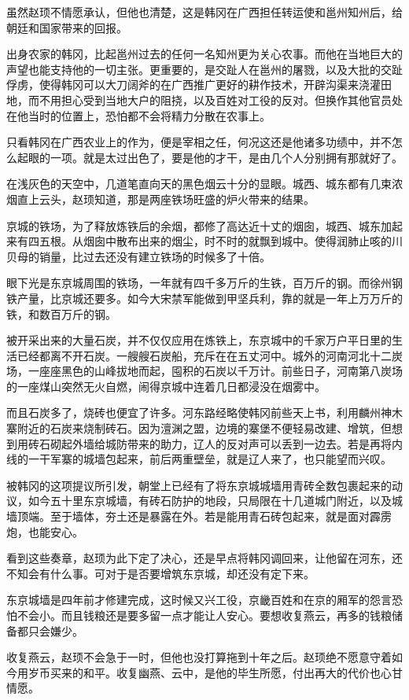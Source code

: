 虽然赵顼不情愿承认，但他也清楚，这是韩冈在广西担任转运使和邕州知州后，给朝廷和国家带来的回报。

出身农家的韩冈，比起邕州过去的任何一名知州更为关心农事。而他在当地巨大的声望也能支持他的一切主张。更重要的，是交趾人在邕州的屠戮，以及大批的交趾俘虏，使得韩冈可以大刀阔斧的在广西推广更好的耕作技术，开辟沟渠来浇灌田地，而不用担心受到当地大户的阻挠，以及百姓对工役的反对。但换作其他官员处在他当时的位置上，恐怕都不会将精力分散在农事上。

只看韩冈在广西农业上的作为，便是宰相之任，何况这还是他诸多功绩中，并不怎么起眼的一项。就是太过出色了，要是他的才干，是由几个人分别拥有那就好了。

在浅灰色的天空中，几道笔直向天的黑色烟云十分的显眼。城西、城东都有几束浓烟直上云头，赵顼知道，那是两座铁场旺盛的炉火带来的结果。

京城的铁场，为了释放炼铁后的余烟，都修了高达近十丈的烟囱，城西、城东加起来有四五根。从烟囱中散布出来的烟尘，时不时的就飘到城中。使得润肺止咳的川贝母的销量，比过去还没有建立铁场的时候多了十倍。

眼下光是东京城周围的铁场，一年就有四千多万斤的生铁，百万斤的钢。而徐州钢铁产量，比京城还要多。如今大宋禁军能做到甲坚兵利，靠的就是一年上万万斤的铁，和数百万斤的钢。

被开采出来的大量石炭，并不仅仅应用在炼铁上，东京城中的千家万户平日里的生活已经都离不开石炭。一艘艘石炭船，充斥在在五丈河中。城外的河南河北十二炭场，一座座黑色的山峰拔地而起，囤积的石炭以千万计。前些日子，河南第八炭场的一座煤山突然无火自燃，闹得京城中连着几日都浸没在烟雾中。

而且石炭多了，烧砖也便宜了许多。河东路经略使韩冈前些天上书，利用麟州神木寨附近的石炭来烧制砖石。因为澶渊之盟，边境的寨堡不便轻易改建、增筑，但想到用砖石砌起外墙给城防带来的助力，辽人的反对声可以丢到一边去。若是再将内线的一干军寨的城墙包起来，前后两重壁垒，就是辽人来了，也只能望而兴叹。

被韩冈的这项提议所引发，朝堂上已经有了将东京城城墙用青砖全数包裹起来的动议，如今五十里东京城墙，有砖石防护的地段，只局限在十几道城门附近，以及城墙顶端。至于墙体，夯土还是暴露在外。若是能用青石砖包起来，就是面对霹雳炮，也能安心。

看到这些奏章，赵顼为此下定了决心，还是早点将韩冈调回来，让他留在河东，还不知会有什么事。可对于是否要增筑东京城，却还没有定下来。

东京城墙是四年前才修建完成，这时候又兴工役，京畿百姓和在京的厢军的怨言恐怕不会小。而且钱粮还是要多留一点才能让人安心。要想收复燕云，再多的钱粮储备都只会嫌少。

收复燕云，赵顼不会急于一时，但他也没打算拖到十年之后。赵顼绝不愿意守着如今用岁币买来的和平。收复幽燕、云中，是他的毕生所愿，付出再大的代价也心甘情愿。

